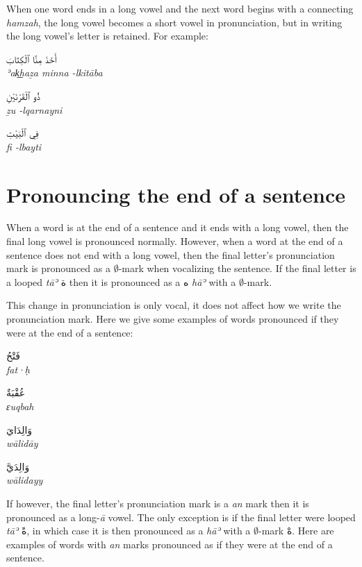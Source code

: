 \documentclass[
  10pt,
]{book}
\begin{document}
When one word ends in a long vowel and the next word begins with a connecting \emph{hamzah}, the long vowel becomes a short vowel in pronunciation, but in writing the long vowel's letter is retained. For example:

\foreignlanguage{arabic}{أَخَذَ مِنَّا ٱلْکِتَابَ}\\
\emph{ʾak͟haẕa minna -lkitāba}

\foreignlanguage{arabic}{ذُو ٱلْقَرْنَيْنِ}\\
\emph{ẕu -lqarnayni}

\foreignlanguage{arabic}{فِي ٱلْبَيْتِ}\\
\emph{fi -lbayti}

\section{Pronouncing the end of a sentence}\label{pronouncing-the-end-of-a-sentence}

When a word is at the end of a sentence and it ends with a long vowel, then the final long vowel is pronounced normally. However, when a word at the end of a sentence does not end with a long vowel, then the final letter's pronunciation mark is pronounced as a \(\emptyset\)-mark when vocalizing the sentence. If the final letter is a looped \emph{tāʾ} \foreignlanguage{arabic}{ة} then it is pronounced as a \foreignlanguage{arabic}{ه} \emph{hāʾ} with a \(\emptyset\)-mark.

This change in pronunciation is only vocal, it does not affect how we write the pronunciation mark. Here we give some examples of words pronounced if they were at the end of a sentence:

\foreignlanguage{arabic}{فَتْحُ}\\
\emph{fat·ḥ}

\foreignlanguage{arabic}{عُقْبَةٌ}\\
\emph{ɛuqbah}

\foreignlanguage{arabic}{وَالِدَايَ}\\
\emph{wālidāy}

\foreignlanguage{arabic}{وَالِدَيَّ}\\
\emph{wālidayy}

If however, the final letter's pronunciation mark is a \emph{an} mark then it is pronounced as a long-\emph{ā} vowel. The only exception is if the final letter were looped \emph{tāʾ} \foreignlanguage{arabic}{ةً}, in which case it is then pronounced as a \emph{hāʾ} with a \(\emptyset\)-mark \foreignlanguage{arabic}{هْ}. Here are examples of words with \emph{an} marks pronounced as if they were at the end of a sentence.
\end{document}
